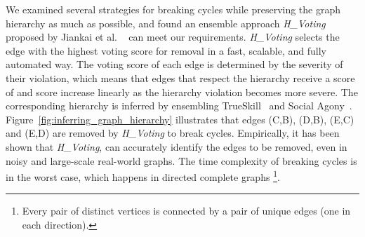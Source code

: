 \documentclass[letterpaper]{article} \usepackage{aaai19}  \usepackage{times}  \usepackage{helvet}  \usepackage{courier}  \usepackage{url}  \usepackage{graphicx}  \usepackage{booktabs} \usepackage{xcolor}
\begin{document}
We examined several strategies for breaking cycles while preserving the graph hierarchy as much as possible, and found an ensemble approach {\em H\_Voting}  proposed by Jiankai  et al. ~\cite{Sun2017} can meet our requirements. {\em H\_Voting} selects the edge with the highest voting score for removal in a fast, scalable, and fully automated way. The voting score of each edge is determined by the severity of their violation, which means that edges that respect the hierarchy receive a score of  and score increase linearly as the hierarchy violation becomes more severe. The corresponding hierarchy is inferred by ensembling TrueSkill~\cite{trueskill2007} and Social Agony~\cite{Gupte2011agony,tatti2015}. Figure~\ref{fig:inferring_graph_hierarchy} illustrates that edges (C,B), (D,B), (E,C) and (E,D) are removed  by {\em H\_Voting} to break cycles. Empirically, it has been shown that {\em H\_Voting}, can accurately identify the edges to be removed, even in noisy and large-scale real-world graphs. The time complexity of breaking cycles is  in the worst case, which happens in directed complete graphs \footnote{Every pair of distinct vertices is connected by a pair of unique edges (one in each direction).}.

\begin{comment}
Sun et al. ~\cite{Sun2017} proposed  different heuristic strategies of breaking cycles to reduce  to ,  while maintaining the graph hierarchy as much as possible, inferred by a range of features such as TrueSkill (TS)~\cite{trueskill2007}  and Social Agony (SA)~\cite{tatti2015}. {\em H\_Voting} is used as the voting scheme to ensemble the above  strategies for breaking cycles in a graph.
{\em H\_Voting} selects the edge with the highest voting score for removal in a fast, scalable, and fully automated way. For example, Figure~\ref{fig:inferring_graph_hierarchy} illustrates that edges (C,B), (D,B), (E,C) and (E,D) are removed  by {\em H\_Voting} to break cycles. We also examined two other voting strategies - {\em SA\_Voting} and {\em TS\_Voting}, which ensembles  Social Agony and  TrueSkill based strategies respectively in our experiments. Empirically, it has been shown that voting based approaches, especially {\em SA\_Voting}, can accurately identify the edges to be removed, even in noisy and large-scale real-world graphs. The time complexity of breaking cycles is  in the worst case, which happens in directed complete graphs \footnote{Every pair of distinct vertices is connected by a pair of unique edges (one in each direction).}.\looseness=-1


\end{comment}
\end{document}
